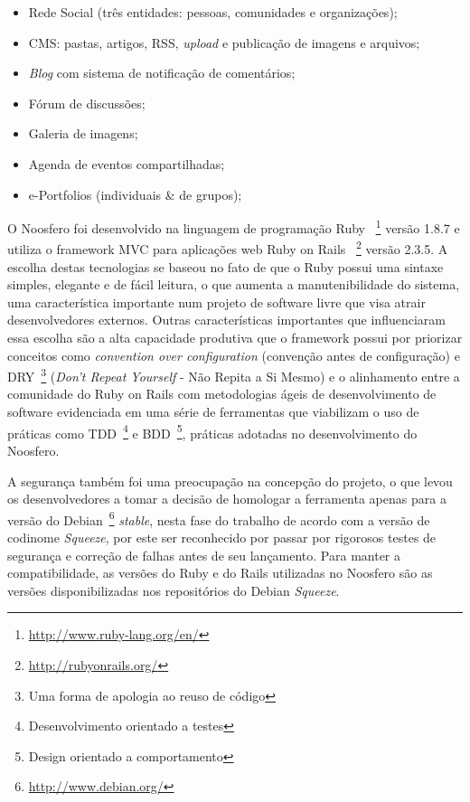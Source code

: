 \begin{itemize}

\item Rede Social (três entidades: pessoas, comunidades e organizações);
\item CMS: pastas, artigos, RSS, \textit{upload} e publicação de imagens e
arquivos;
\item \textit{Blog} com sistema de notificação de comentários;
\item Fórum de discussões;
\item Galeria de imagens;
\item Agenda de eventos compartilhadas;
\item e-Portfolios (individuais \& de grupos);

\end{itemize}


O Noosfero foi desenvolvido na linguagem de programação Ruby
~\footnote{\url{http://www.ruby-lang.org/en/}}
versão 1.8.7 e utiliza o framework MVC para aplicações web Ruby on Rails
~\footnote{\url{http://rubyonrails.org/}}
versão 2.3.5.
%
A escolha destas tecnologias se baseou no fato de que o Ruby possui uma sintaxe
simples, elegante e de fácil leitura, o que aumenta a manutenibilidade do sistema,
uma característica importante num projeto de software livre que visa atrair
desenvolvedores externos. 
%
Outras características importantes que influenciaram essa escolha são a alta
capacidade produtiva que o framework possui por priorizar conceitos como
\textit{convention over configuration} (convenção antes de configuração)
e DRY~\footnote{Uma forma de apologia ao reuso de código}
(\textit{Don't Repeat Yourself} - Não Repita a Si Mesmo)
e o alinhamento entre a comunidade do Ruby on Rails com metodologias ágeis de
desenvolvimento de software evidenciada em uma série de ferramentas que
viabilizam o uso de práticas como TDD~\footnote{Desenvolvimento orientado a testes}
e BDD~\footnote{Design orientado a comportamento}, práticas adotadas no
desenvolvimento do Noosfero.


A segurança também foi uma preocupação na concepção do projeto, o que levou os
desenvolvedores a tomar a decisão de homologar a ferramenta apenas para a
versão do Debian~\footnote{\url{http://www.debian.org/}}
\textit{stable}, nesta fase do trabalho de acordo com a versão de codinome
\textit{Squeeze}, por este ser reconhecido por passar por rigorosos testes de
segurança e correção de falhas antes de seu lançamento. 
%
Para manter a compatibilidade, as versões do Ruby e do Rails utilizadas no
Noosfero são as versões disponibilizadas nos repositórios do Debian
\textit{Squeeze}.

